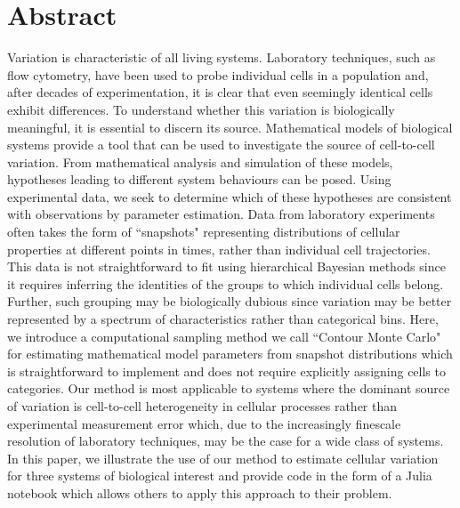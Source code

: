 \documentclass[10pt,letterpaper]{article}
\begin{document}
\newpage
\section{Abstract}
Variation is characteristic of all living systems. Laboratory techniques, such as flow cytometry, have been used to probe individual cells in a population and, after decades of experimentation, it is clear that even seemingly identical cells exhibit differences. To understand whether this variation is biologically meaningful, it is essential to discern its source. Mathematical models of biological systems provide a tool that can be used to investigate the source of cell-to-cell variation. From mathematical analysis and simulation of these models, hypotheses leading to different system behaviours can be posed. Using experimental data, we seek to determine which of these hypotheses are consistent with observations by parameter estimation. Data from laboratory experiments often takes the form of ``snapshots" representing distributions of cellular properties at different points in times, rather than individual cell trajectories. This data is not straightforward to fit using hierarchical Bayesian methods since it requires inferring the identities of the groups to which individual cells belong. Further, such grouping may be biologically dubious since variation may be better represented by a spectrum of characteristics rather than categorical bins. Here, we introduce a computational sampling method we call ``Contour Monte Carlo" for estimating mathematical model parameters from snapshot distributions which is straightforward to implement and does not require explicitly assigning cells to categories. Our method is most applicable to systems where the dominant source of variation is cell-to-cell heterogeneity in cellular processes rather than experimental measurement error which, due to the increasingly finescale resolution of laboratory techniques, may be the case for a wide class of systems. In this paper, we illustrate the use of our method to estimate cellular variation for three systems of biological interest and provide code in the form of a Julia notebook which allows others to apply this approach to their problem.
\end{document}
